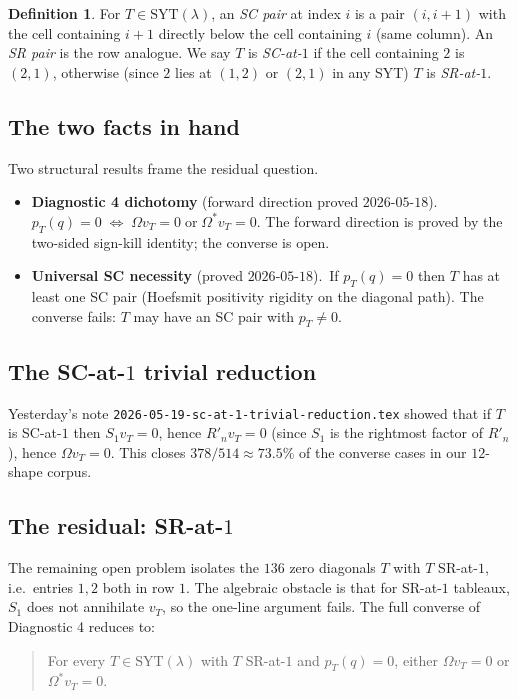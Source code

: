 \documentclass[11pt]{article}
\theoremstyle{definition}
\newtheorem{definition}[theorem]{Definition}
\newcommand{\la}{\lambda}
\newcommand{\Om}{\Omega}
\newcommand{\Omstar}{\Omega^{*}}
\newcommand{\SYT}{\mathrm{SYT}}
\begin{document}
\begin{definition}
For $T \in \SYT(\la)$, an \emph{SC pair} at index $i$ is a pair
$(i, i+1)$ with the cell containing $i+1$ directly below the cell
containing $i$ (same column). An \emph{SR pair} is the row analogue.
We say $T$ is \emph{SC-at-$1$} if the cell containing $2$ is $(2,1)$,
otherwise (since $2$ lies at $(1,2)$ or $(2,1)$ in any SYT) $T$ is
\emph{SR-at-$1$}.
\end{definition}

\subsection{The two facts in hand}
Two structural results frame the residual question.

\begin{itemize}
\item \textbf{Diagnostic 4 dichotomy} (forward direction proved
$2026$-$05$-$18$).\
$p_T(q) = 0 \;\Leftrightarrow\; \Om v_T = 0 \;\text{or}\;
\Omstar v_T = 0$. The forward direction is proved by the
two-sided sign-kill identity; the converse is open.
\item \textbf{Universal SC necessity} (proved $2026$-$05$-$18$).\
If $p_T(q) = 0$ then $T$ has at least one SC pair (Hoefsmit
positivity rigidity on the diagonal path). The converse fails: $T$
may have an SC pair with $p_T \ne 0$.
\end{itemize}

\subsection{The SC-at-$1$ trivial reduction}
Yesterday's note \texttt{2026-05-19-sc-at-1-trivial-reduction.tex}
showed that if $T$ is SC-at-$1$ then $S_1 v_T = 0$, hence
$R'_n v_T = 0$ (since $S_1$ is the rightmost factor of $R'_n$),
hence $\Om v_T = 0$. This closes $378/514 \approx 73.5\%$ of the
converse cases in our $12$-shape corpus.

\subsection{The residual: SR-at-$1$}
The remaining open problem isolates the $136$ zero diagonals
$T$ with $T$ SR-at-$1$, i.e.\ entries $1, 2$ both in row $1$. The
algebraic obstacle is that for SR-at-$1$ tableaux, $S_1$ does not
annihilate $v_T$, so the one-line argument fails. The full converse
of Diagnostic 4 reduces to:

\begin{quote}
For every $T \in \SYT(\la)$ with $T$ SR-at-$1$ and $p_T(q) = 0$,
either $\Om v_T = 0$ or $\Omstar v_T = 0$.
\end{quote}
\end{document}
